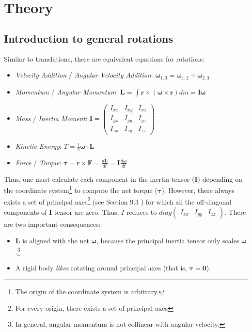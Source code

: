 \section{Theory} \label{sec:theory}

\subsection{Introduction to general rotations}
\label{sec:theory:introduction}

Similar to translations, there are equivalent equations for rotations:
\begin{itemize}
\item \emph{Velocity Addition} / \emph{Angular Velocity Addition}: $\boldsymbol\omega_{1,3} = \boldsymbol\omega_{1,2} + \boldsymbol\omega_{2,3}$
\item \emph{Momentum} / \emph{Angular Momentum}: $\mathbf{L} = \int \mathbf{r} \times (\boldsymbol\omega \times \mathbf{r}) dm = \mathbf{I} \boldsymbol\omega$
\item \emph{Mass} / \emph{Inertia Moment}: $\mathbf{I} = \begin{pmatrix} I_{xx} & I_{xy} & I_{xz} \\ I_{yx} & I_{yy} & I_{yz} \\ I_{zx} & I_{zy} & I_{zz} \end{pmatrix}$
\item \emph{Kinetic Energy}: $T = \frac{1}{2} \boldsymbol\omega \cdot \mathbf{L} $
\item \emph{Force} / \emph{Torque}: $\boldsymbol\tau = \mathbf{r} \times \mathbf{F} = \frac{d\mathbf{L}}{dt} = \mathbf{I}\frac{d\boldsymbol\omega}{dt}$
\end{itemize}

Thus, one must calculate each component in the inertia tensor ($\mathbf{I}$) depending on the coordinate system\footnote{The origin of the coordinate system is arbitrary.} to compute the net torque ($\boldsymbol{\tau}$). However, there always exists a set of principal axes\footnote{For every origin, there exists a set of principal axes} (see Section 9.3 \cite{1}) for which all the off-diagonal components of $\mathbf{I}$ tensor are zero. Thus, $I$ reduces to $diag \begin{pmatrix} I_{xx} & I_{yy} & I_{zz} \end{pmatrix}$. There are two important consequences:
\begin{itemize}
\item $\mathbf{L}$ is aligned with the net $\boldsymbol\omega$, because the principal inertia tensor only scales $\boldsymbol\omega$.\footnote{In general, angular momentum is not collinear with angular velocity.}
\item A rigid body \emph{likes} rotating around principal axes (that is, $\boldsymbol\tau = \mathbf{0}$).
\end{itemize}

